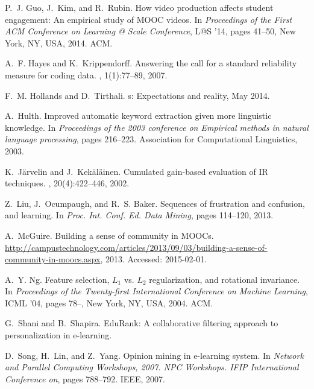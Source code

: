 \documentclass{edm_template}
\begin{document}
\begin{thebibliography}{10}
P.~J. Guo, J.~Kim, and R.~Rubin.
\newblock How video production affects student engagement: An empirical study
  of {MOOC} videos.
\newblock In {\em Proceedings of the First ACM Conference on Learning @ Scale
  Conference}, L@S '14, pages 41--50, New York, NY, USA, 2014. ACM.

A.~F. Hayes and K.~Krippendorff.
\newblock Answering the call for a standard reliability measure for coding
  data.
, 1(1):77--89, 2007.

F.~M. Hollands and D.~Tirthali.
s: Expectations and reality, May 2014.

A.~Hulth.
\newblock Improved automatic keyword extraction given more linguistic
  knowledge.
\newblock In {\em Proceedings of the 2003 conference on Empirical methods in
  natural language processing}, pages 216--223. Association for Computational
  Linguistics, 2003.

K.~J{\"a}rvelin and J.~Kek{\"a}l{\"a}inen.
\newblock Cumulated gain-based evaluation of {IR} techniques.
, 20(4):422--446,
  2002.

Z.~Liu, J.~Ocumpaugh, and R.~S. Baker.
\newblock Sequences of frustration and confusion, and learning.
\newblock In {\em Proc. Int. Conf. Ed. Data Mining}, pages 114--120, 2013.

A.~McGuire.
\newblock Building a sense of community in {MOOC}s.
\newblock
  \url{http://campustechnology.com/articles/2013/09/03/building-a-sense-of-community-in-moocs.aspx},
  2013.
\newblock Accessed: 2015-02-01.

A.~Y. Ng.
\newblock Feature selection, {$L_{1}$} vs. {$L_{2}$} regularization, and
  rotational invariance.
\newblock In {\em Proceedings of the Twenty-first International Conference on
  Machine Learning}, ICML '04, pages 78--, New York, NY, USA, 2004. ACM.

G.~Shani and B.~Shapira.
\newblock EduRank: A collaborative filtering approach to personalization in
  e-learning.

D.~Song, H.~Lin, and Z.~Yang.
\newblock Opinion mining in e-learning system.
\newblock In {\em Network and Parallel Computing Workshops, 2007. NPC
  Workshops. IFIP International Conference on}, pages 788--792. IEEE, 2007.


\end{thebibliography}
\end{document}
